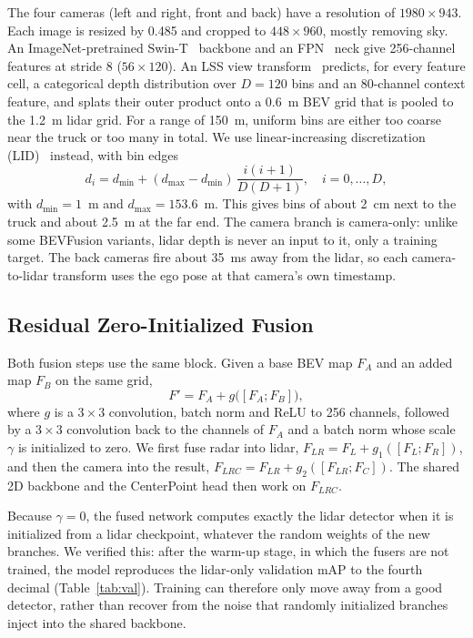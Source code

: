 \documentclass[conference]{IEEEtran}
\begin{document}
The four cameras (left and right, front and back) have a resolution of $1980 \times 943$. Each image is resized by
0.485 and cropped to $448 \times 960$, mostly removing sky. An ImageNet-pretrained Swin-T~\cite{liu2021swin} backbone and an FPN~\cite{lin2017fpn} neck give 256-channel features at stride 8
($56 \times 120$). An LSS view transform~\cite{philion2020lss} predicts, for every feature cell, a categorical depth
distribution over $D = 120$ bins and an 80-channel context feature, and splats their outer product onto a 0.6~m BEV
grid that is pooled to the 1.2~m lidar grid. For a range of 150~m, uniform bins are either too coarse near the truck or
too many in total. We use linear-increasing discretization (LID)~\cite{reading2021caddn} instead, with bin edges
\begin{equation}
d_i = d_{\min} + (d_{\max} - d_{\min})\,\frac{i(i+1)}{D(D+1)}, \quad i = 0, \dots, D,
\end{equation}
with $d_{\min} = 1$~m and $d_{\max} = 153.6$~m. This gives bins of about 2~cm next to the truck and about 2.5~m
at the far end. The camera branch is camera-only: unlike some BEVFusion variants, lidar depth is never an input to
it, only a training target. The back cameras fire about 35~ms away from the lidar, so each camera-to-lidar transform
uses the ego pose at that camera's own timestamp.

\subsection{Residual Zero-Initialized Fusion}

Both fusion steps use the same block. Given a base BEV map $F_A$ and an added map $F_B$ on the same grid,
\begin{equation}
F' = F_A + g\big([F_A; F_B]\big),
\end{equation}
where $g$ is a $3{\times}3$ convolution, batch norm and ReLU to 256 channels, followed by a $3{\times}3$ convolution back
to the channels of $F_A$ and a batch norm whose scale $\gamma$ is initialized to zero. We first fuse radar into lidar,
$F_{LR} = F_L + g_1([F_L; F_R])$, and then the camera into the result,
$F_{LRC} = F_{LR} + g_2([F_{LR}; F_C])$. The shared 2D backbone and the CenterPoint head then work on $F_{LRC}$.

Because $\gamma = 0$, the fused network computes exactly the lidar detector when it is initialized from a lidar
checkpoint, whatever the random weights of the new branches. We verified this: after the warm-up stage, in which the
fusers are not trained, the model reproduces the lidar-only validation mAP to the fourth decimal
(Table~\ref{tab:val}). Training can therefore only move away from a good detector, rather than recover from the
noise that randomly initialized branches inject into the shared backbone.
\end{document}
